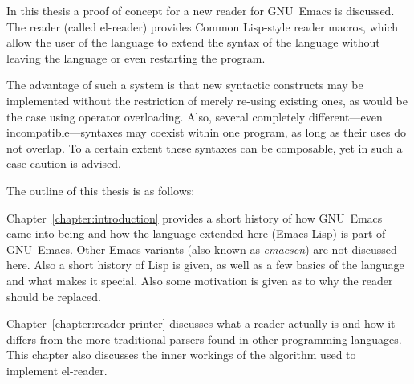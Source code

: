 \documentclass[a4paper,10pt,twoside]{report}
\newcommand{\el}{Emacs Lisp}
\newcommand{\cl}{Common Lisp}
\newcommand{\elr}{el-reader}
\newcommand{\emacs}{GNU~Emacs}
\begin{document}
In this thesis a proof of concept for a new reader for \emacs{} is discussed.
The reader (called \elr{}) provides \cl{}-style reader macros, which allow the
user of the language to extend the syntax of the language without leaving the
language or even restarting the program.

The advantage of such a system is that new syntactic constructs may be
implemented without the restriction of merely re-using existing ones, as would
be the case using operator overloading.  Also, several completely
different---even incompatible---syntaxes may coexist within one program, as long
as their uses do not overlap.  To a certain extent these syntaxes can be
composable, yet in such a case caution is advised.

The outline of this thesis is as follows:

Chapter~\ref{chapter:introduction} provides a short history of how \emacs{} came
into being and how the language extended here (\el{}) is part of \emacs{}.
Other Emacs variants (also known as \emph{emacsen}) are not discussed here.
Also a short history of Lisp is given, as well as a few basics of the language
and what makes it special.  Also some motivation is given as to why the reader
should be replaced.






Chapter~\ref{chapter:reader-printer} discusses what a reader actually is and how
it differs from the more traditional parsers found in other programming
languages.  This chapter also discusses the inner workings of the algorithm used
to implement \elr{}.
\end{document}
